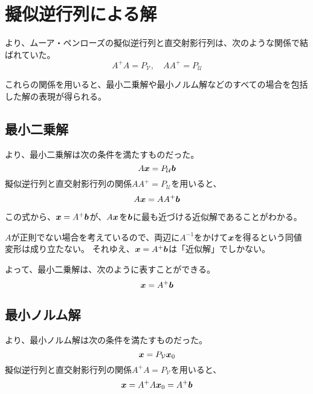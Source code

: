 \documentclass[../../../topic_linear-algebra]{subfiles}
\begin{document}
\sectionline
\section{擬似逆行列による解}

より、ムーア・ペンローズの擬似逆行列と直交射影行列は、次のような関係で結ばれていた。
\begin{equation*}
  A^+ A = P_{\mathcal{V}}, \quad A A^+ = P_{\mathcal{U}}
\end{equation*}

これらの関係を用いると、最小二乗解や最小ノルム解などのすべての場合を包括した解の表現が得られる。

\subsection{最小二乗解}

より、最小二乗解は次の条件を満たすものだった。
\begin{equation*}
  A \vb*{x} = P_{\mathcal{U}} \vb*{b}
\end{equation*}
擬似逆行列と直交射影行列の関係$AA^+ = P_{\mathcal{U}}$を用いると、
\begin{equation*}
  A \vb*{x} = A A^+ \vb*{b}
\end{equation*}

この式から、$\vb*{x}=A^+ \vb*{b}$が、$A\vb*{x}$を$\vb*{b}$に最も近づける近似解であることがわかる。

\begin{supplnote}
  $A$が正則でない場合を考えているので、両辺に$A^{-1}$をかけて$\vb*{x}$を得るという同値変形は成り立たない。
  それゆえ、$\vb*{x} = A^+ \vb*{b}$は「近似解」でしかない。
\end{supplnote}

よって、最小二乗解は、次のように表すことができる。
\begin{equation*}
  \vb*{x} = A^+ \vb*{b}
\end{equation*}

\subsection{最小ノルム解}

より、最小ノルム解は次の条件を満たすものだった。
\begin{equation*}
  \vb*{x} = P_{\mathcal{V}} \vb*{x}_0
\end{equation*}
擬似逆行列と直交射影行列の関係$A^+ A = P_{\mathcal{V}}$を用いると、
\begin{equation*}
  \vb*{x} = A^+ A \vb*{x}_0 = A^+ \vb*{b}
\end{equation*}
\end{document}
